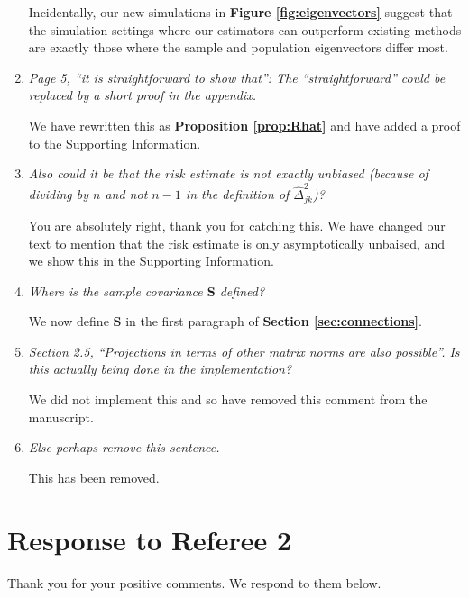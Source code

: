 \documentclass[12pt]{article}
\def\bs{\boldsymbol}
\begin{document}
\begin{enumerate}
  Incidentally, our new simulations in \textbf{Figure \ref{fig:eigenvectors}} suggest that the simulation settings where our estimators can outperform existing methods are exactly those where the sample and population eigenvectors differ most.
  
\item \emph{Page 5, ``it is straightforward to show that'': The ``straightforward'' could be replaced by a short proof in the appendix.}

  We have rewritten this as \textbf{Proposition \ref{prop:Rhat}} and have added a proof to the Supporting Information.
  
\item \emph{Also could it be that the risk estimate is not exactly unbiased (because of dividing by $n$ and not $n-1$ in the definition of $\hat{\Delta}_{jk}^2$)?}

  You are absolutely right, thank you for catching this. We have changed our text to mention that the risk estimate is only asymptotically unbaised, and we show this in the Supporting Information.
  
\item \emph{Where is the sample covariance $\bs{S}$ defined?}

  We now define $\bs{S}$ in the first paragraph of \textbf{Section \ref{sec:connections}}.

\item \emph{Section 2.5, ``Projections in terms of other matrix norms are also possible''. Is this actually being done in the implementation?}

  We did not implement this and so have removed this comment from the manuscript.

\item \emph{Else perhaps remove this sentence.}

This has been removed.

\end{enumerate}

\section{Response to Referee 2}

Thank you for your positive comments. We respond to them below.
\end{document}
